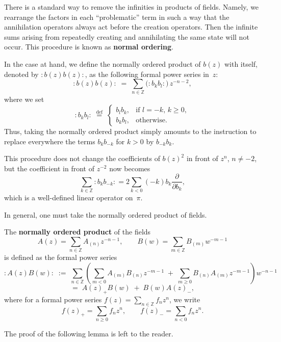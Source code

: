 \documentclass[12pt]{article}
\begin{document}
There is a standard way to remove the infinities in products of fields.
Namely, we rearrange the factors in each ``problematic'' term in such a way that the annihilation operators always act before the creation operators.
Then the infinite sums arising from repeatedly creating and annihilating the same state will not occur.
This procedure is known as \textbf{normal ordering}.

\medskip

In the case at hand, we define the normally ordered product of $b(z)$ with itself, denoted by $:b(z)b(z):$, as the following formal power series in~$z$:
\[
:b(z)b(z):
\;=\;
\sum_{n\in\mathbb{Z}} \big(:b_k b_l:\big)\,z^{-n-2},
\]
where we set
\[
:b_k b_l:
\;\stackrel{\mathrm{def}}{=}\;
\begin{cases}
b_l b_k, & \text{if } l=-k,\, k\ge0,\\[4pt]
b_k b_l, & \text{otherwise.}
\end{cases}
\]
Thus, taking the normally ordered product simply amounts to the instruction to replace everywhere the terms $b_k b_{-k}$ for $k>0$ by $b_{-k} b_k$.

\medskip

This procedure does not change the coefficients of $b(z)^2$ in front of $z^n$, $n\ne -2$, but the coefficient in front of $z^{-2}$ now becomes
\[
\sum_{k\in\mathbb{Z}} :b_k b_{-k}:
= 2\sum_{k<0} (-k)b_k \frac{\partial}{\partial b_k},
\]
which is a well-defined linear operator on~$\pi$.

\medskip

In general, one must take the normally ordered product of fields.
\begin{definition}
The \textbf{normally ordered product} of the fields
\[
A(z) = \sum_{n\in\mathbb{Z}} A_{(n)} z^{-n-1},
\qquad
B(w) = \sum_{m\in\mathbb{Z}} B_{(m)} w^{-m-1}
\]
is defined as the formal power series
\[
:A(z)B(w):
\;:=\;
\sum_{n\in\mathbb{Z}}
\left(
\sum_{m<0} A_{(m)}B_{(n)}z^{-m-1}
\;+\;
\sum_{m\ge0} B_{(n)}A_{(m)}z^{-m-1}
\right)
w^{-n-1}
\]
\[
=\;
A(z)_+ B(w) \;+\; B(w)A(z)_-,
\]
where for a formal power series $f(z) = \sum_{n\in\mathbb{Z}} f_n z^n$, we write
\[
f(z)_+ = \sum_{n\ge0} f_n z^n,
\qquad
f(z)_- = \sum_{n<0} f_n z^n.
\]
\end{definition}

The proof of the following lemma is left to the reader.
\end{document}
